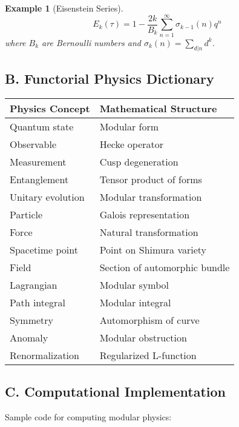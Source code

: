 \documentclass[12pt,a4paper]{article}
\newtheorem{example}[theorem]{Example}
\begin{document}
\begin{example}[Eisenstein Series]
\[
E_k(\tau) = 1 - \frac{2k}{B_k} \sum_{n=1}^\infty \sigma_{k-1}(n) q^n
\]
where $B_k$ are Bernoulli numbers and $\sigma_k(n) = \sum_{d|n} d^k$.
\end{example}

\subsection{B. Functorial Physics Dictionary}

\begin{center}
\begin{tabular}{|l|l|}
\hline
\textbf{Physics Concept} & \textbf{Mathematical Structure} \\
\hline
Quantum state & Modular form \\
Observable & Hecke operator \\
Measurement & Cusp degeneration \\
Entanglement & Tensor product of forms \\
Unitary evolution & Modular transformation \\
Particle & Galois representation \\
Force & Natural transformation \\
Spacetime point & Point on Shimura variety \\
Field & Section of automorphic bundle \\
Lagrangian & Modular symbol \\
Path integral & Modular integral \\
Symmetry & Automorphism of curve \\
Anomaly & Modular obstruction \\
Renormalization & Regularized L-function \\
\hline
\end{tabular}
\end{center}

\subsection{C. Computational Implementation}

Sample code for computing modular physics:
\end{document}
